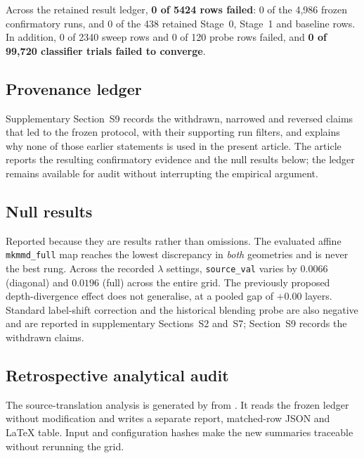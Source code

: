 Across the retained result ledger, \textbf{0 of 5424 rows failed}: 0 of the
4,986 frozen confirmatory runs, and 0 of the 438 retained Stage~0, Stage~1 and
baseline rows. In addition, 0 of 2340 sweep rows and 0 of 120 probe rows failed,
and \textbf{0 of 99{,}720 classifier trials failed to converge}.

\subsection{Provenance ledger}
\label{sec:repro-retractions}

Supplementary Section~S9 records the withdrawn, narrowed and reversed claims
that led to the frozen protocol, with their supporting run filters, and
explains why none of those earlier statements is used in the present article.
The article reports the resulting confirmatory evidence and the null results
below; the ledger remains available for audit without interrupting the
empirical argument.

\subsection{Null results}
\label{sec:repro-nulls}

Reported because they are results rather than omissions. The evaluated affine
\texttt{mkmmd\_full} map reaches the lowest discrepancy in \emph{both}
geometries and is never the best rung. Across the recorded $\lambda$ settings,
\texttt{source\_val} varies by $0.0066$ (diagonal) and $0.0196$ (full) across the
entire grid. The previously proposed depth-divergence effect does not
generalise, at a pooled gap of $+0.00$ layers. Standard label-shift correction
and the historical blending probe are also negative and are reported in
supplementary Sections~S2 and~S7; Section~S9 records the withdrawn claims.

\subsection{Retrospective analytical audit}
\label{sec:repro-audit}

The source-translation analysis is generated by
 from
. It reads the frozen ledger without
modification and writes a separate report, matched-row JSON and LaTeX table.
Input and configuration hashes make the new summaries traceable without
rerunning the grid.


